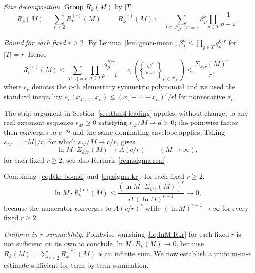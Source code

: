 \documentclass[11pt]{article}
\theoremstyle{remark}
\newcommand{\PM}{\mathcal{P}_M}
\begin{document}
\emph{Size decomposition.}
Group $R_k(M)$ by $|T|$:
\[
R_k(M) = \sum_{r \geq 2} R_k^{(r)}(M), \qquad R_k^{(r)}(M) := \sum_{T \subseteq \PM,\, |T| = r} \beta_T^k \prod_{p \in T} \frac{1}{p-1}.
\]

\emph{Bound for each fixed $r \geq 2$.}
By Lemma~\ref{lem:geom-mean}, $\beta_T^k \leq \prod_{p \in T} q_p^{k/r}$ for $|T| = r$. Hence
\begin{equation}\label{eq:Rkr-bound}
R_k^{(r)}(M) \leq \sum_{T \colon |T| = r} \prod_{p \in T} \frac{q_p^{k/r}}{p-1} = e_r\!\left(\left\{\tfrac{q_p^{k/r}}{p-1}\right\}_{p \in \PM}\right) \leq \frac{\Sigma_{k/r}(M)^r}{r!},
\end{equation}
where $e_r$ denotes the $r$-th elementary symmetric polynomial and we used the standard inequality $e_r(x_1, \ldots, x_n) \leq (x_1 + \cdots + x_n)^r / r!$ for nonnegative $x_i$.

The strip argument in Section~\ref{sec:thm4-leading} applies, without change, to any real exponent sequence $s_M \geq 0$ satisfying $s_M/M \to d>0$; the pointwise factor then converges to $e^{-dj}$ and the same dominating envelope applies. Taking $s_M=\lfloor cM\rfloor/r$, for which $s_M/M\to c/r$, gives
\begin{equation}\label{eq:sigma-kr}
\ln M \cdot \Sigma_{k/r}(M) \longrightarrow A(c/r) \qquad (M \to \infty),
\end{equation}
for each fixed $r \geq 2$; see also Remark~\ref{rem:sigma-real}.

Combining~\eqref{eq:Rkr-bound} and~\eqref{eq:sigma-kr}, for each fixed $r \geq 2$,
\begin{equation}\label{eq:lnM-Rkr}
\ln M \cdot R_k^{(r)}(M)
\leq \frac{(\ln M \cdot \Sigma_{k/r}(M))^r}{r!\, (\ln M)^{r-1}}
\longrightarrow 0,
\end{equation}
because the numerator converges to $A(c/r)^r$ while $(\ln M)^{r-1} \to \infty$ for every fixed $r \geq 2$.

\emph{Uniform-in-$r$ summability.}
Pointwise vanishing~\eqref{eq:lnM-Rkr} for each fixed $r$ is not sufficient on its own to conclude $\ln M \cdot R_k(M) \to 0$, because $R_k(M) = \sum_{r \geq 2} R_k^{(r)}(M)$ is an infinite sum. We now establish a uniform-in-$r$ estimate sufficient for term-by-term summation.
\end{document}
